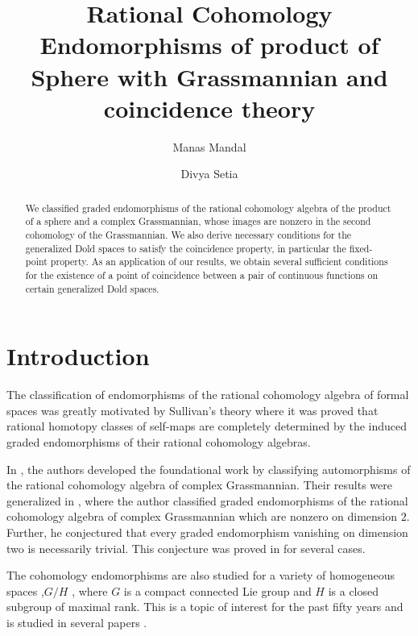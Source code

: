 \documentclass{amsart}
\title[Graded Endomorphisms of $H^*(\mathbb{S}^m \times \mathbb{C}G_{n,k};\mathbb Q)$]{%
Rational Cohomology Endomorphisms of product of Sphere with Grassmannian and coincidence theory%
}
\author[M. Mandal]{Manas Mandal}
\author[D. Setia]{Divya Setia}
\begin{document}
	\begin{abstract}
		We classified graded endomorphisms of the rational cohomology algebra of the product of a sphere and a complex Grassmannian, whose images are nonzero  in the second cohomology of the Grassmannian.
		We also derive necessary conditions for the generalized Dold spaces to satisfy the coincidence property, in particular the fixed-point property. As an application of our results, we obtain several sufficient conditions for the existence of a point of coincidence between a pair of continuous functions on certain generalized Dold spaces. 
	\end{abstract}
	
	\maketitle
	
	\section{Introduction} \label{intro}
	The classification of endomorphisms of the rational cohomology algebra of formal spaces was greatly motivated by Sullivan's theory where it was  proved that rational %
homotopy classes of %
self-maps are completely determined by the induced graded endomorphisms of their rational cohomology algebras. 
	
	In \cite{brewster}, the authors developed the foundational work by classifying automorphisms of the rational cohomology algebra of complex Grassmannian. Their results were generalized in \cite{hoffman}, where the author classified graded endomorphisms of the rational cohomology algebra of complex Grassmannian which are nonzero on dimension $2$. Further, he conjectured that every graded endomorphism  vanishing on dimension two is necessarily trivial. This conjecture was proved in \cite{glover-homer} for several cases.
	
	The cohomology endomorphisms are also studied for a variety of %
homogeneous spaces ,$G/H$%
, where $G$ is a compact connected Lie group and $H$ is a closed
	subgroup of maximal rank. This is a topic of %
interest for the past %
fifty years %
and is studied %
in several papers \cite{shiga-tezuka2, brewster-homer, hoffman-homer, Papadima, duan, duan-fang, duan-zhao, lin, goswami-sarkar}. 
	
\end{document}
